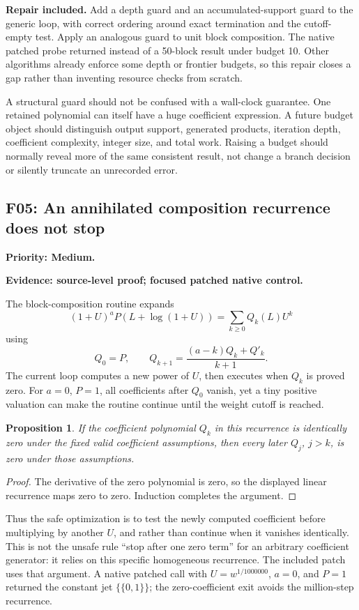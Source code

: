 \documentclass[11pt,a4paper]{article}
\newcommand{\code}[1]{\texttt{\detokenize{#1}}}
\newcommand{\finding}[3]{\Needspace{8\baselineskip}\subsection{#1: #2}\textbf{Priority: #3.}\par}
\newtheorem{proposition}{Proposition}[section]
\begin{document}
\textbf{Repair included.} Add a depth guard and an accumulated-support guard to the generic loop, with correct ordering around exact termination and the cutoff-empty test. Apply an analogous guard to unit block composition. The native patched probe returned \code{Failure["ResourceLimit", ...]} instead of a 50-block result under budget 10. Other algorithms already enforce some depth or frontier budgets, so this repair closes a gap rather than inventing resource checks from scratch.\cite{repo-incremental}

A structural guard should not be confused with a wall-clock guarantee. One retained polynomial can itself have a huge coefficient expression. A future budget object should distinguish output support, generated products, iteration depth, coefficient complexity, integer size, and total work. Raising a budget should normally reveal more of the same consistent result, not change a branch decision or silently truncate an unrecorded error.

\finding{F05}{An annihilated composition recurrence does not stop}{Medium}
\textbf{Evidence: source-level proof; focused patched native control.}

The block-composition routine expands
\[
 (1+U)^a P(L+\log(1+U))=\sum_{k\ge0}Q_k(L)U^k
\]
using
\[
 Q_0=P,\qquad
 Q_{k+1}=\frac{(a-k)Q_k+Q'_k}{k+1}.
\]
The current loop computes a new power of \(U\), then executes \code{Continue[]} when \(Q_k\) is proved zero. For \(a=0\), \(P=1\), all coefficients after \(Q_0\) vanish, yet a tiny positive valuation can make the routine continue until the weight cutoff is reached.\cite{repo-main}

\begin{proposition}
If the coefficient polynomial \(Q_k\) in this recurrence is identically zero under the fixed valid coefficient assumptions, then every later \(Q_j\), \(j>k\), is zero under those assumptions.
\end{proposition}
\begin{proof}
The derivative of the zero polynomial is zero, so the displayed linear recurrence maps zero to zero. Induction completes the argument.
\end{proof}

Thus the safe optimization is to test the newly computed coefficient before multiplying by another \(U\), and \code{Break[]} rather than continue when it vanishes identically. This is not the unsafe rule ``stop after one zero term'' for an arbitrary coefficient generator: it relies on this specific homogeneous recurrence. The included patch uses that argument. A native patched call with \(U=w^{1/1000000}\), \(a=0\), and \(P=1\) returned the constant jet \(\{\{0,1\}\}\); the zero-coefficient exit avoids the million-step recurrence.
\end{document}
